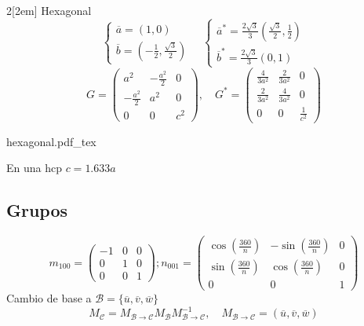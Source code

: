 \documentclass[leqno]{article}
\newcommand{\incfig}[1]{%
\begin{center}
\def\svgwidth{0.9\columnwidth}
{#1.pdf_tex}
\end{center}
}
\begin{document}
\begin{multicols}{2}[\columnsep2em]
Hexagonal
\[
\begin{cases}
  \overline{a} = (1, 0)\\
  \overline{b} = (-\frac{1}{2}, \frac{\sqrt{3} }{2})
\end{cases} \quad
\begin{cases}
  \overline{a}^* = \frac{2 \sqrt{3} }{3}(\frac{\sqrt{3} }{2}, \frac{1}{2}) \\
  \overline{b}^* = \frac{2 \sqrt{3} }{3}( 0, 1)
\end{cases}
\]
\[
  G = \begin{pmatrix} a^2 & -\frac{a^2}{2} & 0 \\ -\frac{a^2}{2} & a^2 & 0 \\ 0 & 0 & c^2\end{pmatrix} , \quad
  G^* = \begin{pmatrix} \frac{4}{3a^2} & \frac{2}{3a^2} & 0 \\ \frac{2}{3a^2} & \frac{4}{3a^2} & 0 \\ 0 & 0 & \frac{1}{c^2}\end{pmatrix} 
\] 

\begin{minipage}{\columnwidth}
  \incfig{hexagonal}
\end{minipage}

En una hcp $c = 1.633a$

\subsection{Grupos}
\[
  m_{100} = \begin{pmatrix} -1&0&0\\0&1&0\\0&0&1 \end{pmatrix};
  n_{001} = \begin{pmatrix} \cos\left( \frac{360}{n} \right) &-\sin\left( \frac{360}{n} \right) &0\\ \sin\left( \frac{360}{n} \right) &\cos\left( \frac{360}{n} \right) &0\\0&0&1 \end{pmatrix}
\] 
Cambio de base a $\mathcal{B}=\{\overline{u}, \overline{v}, \overline{w}\}$
\[
  M_{\mathcal{C}} = M_{\mathcal{B}\to \mathcal{C}} M_{\mathcal{B}} M_{\mathcal{B}\to \mathcal{C}}^{-1}, \quad M_{\mathcal{B}\to \mathcal{C}} = (\overline{u}, \overline{v}, \overline{w})
\] 


\end{multicols}
\end{document}
